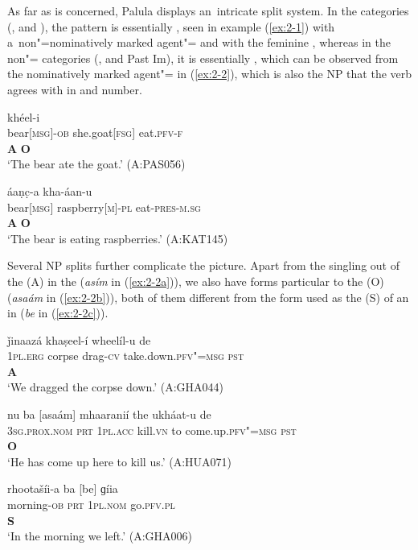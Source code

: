 As far as  is concerned, Palula displays an~intricate split system. In the  categories (,  and ), the pattern is essentially , seen in example (\ref{ex:2-1}) with a~non"=nominatively marked agent"= and  with the feminine , whereas in the non"= categories (,  and Past Im), it is essentially , which can be observed from the nominatively marked agent"= in (\ref{ex:2-2}), which is also the NP that the  verb agrees with in  and number.

\begin{exe}
\ex
\label{ex:2-1}
\glll [íṇc̣-a] [čhéeli] khéel-i \\
bear[\textsc{msg}]-\textsc{ob} she.goat[\textsc{fsg}] eat.\textsc{pfv-}\textsc{f}\\
\textbf{A} \textbf{O} \\
\glt `The bear ate the goat.' (A:PAS056)
\end{exe}


\begin{exe}
\ex
\label{ex:2-2}
\glll [iṇc̣] áaṇc̣-a kha-áan-u\\
bear[\textsc{msg}] raspberry[\textsc{m}]-\textsc{pl} eat-\textsc{pres-m.sg} \\
\textbf{A} \textbf{O} \\
\glt `The bear is eating raspberries.' (A:KAT145)
\end{exe} 

Several NP splits further complicate the picture. Apart from the singling out of the   (A) in the  (\textit{asím} in (\ref{ex:2-2a})), we also have  forms particular to the  (O) (\textit{asaám} in (\ref{ex:2-2b})), both of them different from the form used as the  (S) of an in  (\textit{be} in (\ref{ex:2-2c})).

\begin{exe}
\ex
\label{ex:2-2a}
\glll [asím] ǰinaazá khaṣeel-í wheelíl-u de \\
\textsc{1pl.erg} corpse drag-\textsc{cv} take.down.\textsc{pfv"=msg} \textsc{pst}  \\
\textbf{A} \\
\glt `We dragged the corpse down.' (A:GHA044)

\ex
\label{ex:2-2b}
\glll nu ba [asaám] mhaaranií the ukháat-u de \\
\textsc{3sg.prox.nom} \textsc{prt} \textsc{1pl.acc} kill.\textsc{vn} to come.up.\textsc{pfv"=msg} \textsc{pst}  \\
{} {}   \textbf{O} \\
\glt `He has come up here to kill us.' (A:HUA071)

\ex
\label{ex:2-2c}
\glll rhootašíi-a ba [be] ɡíia  \\
morning-\textsc{ob} \textsc{prt} \textsc{1pl.nom} go.\textsc{pfv.pl}  \\
 {} {}  \textbf{S} \\
\glt `In the morning we left.' (A:GHA006)
\end{exe}


